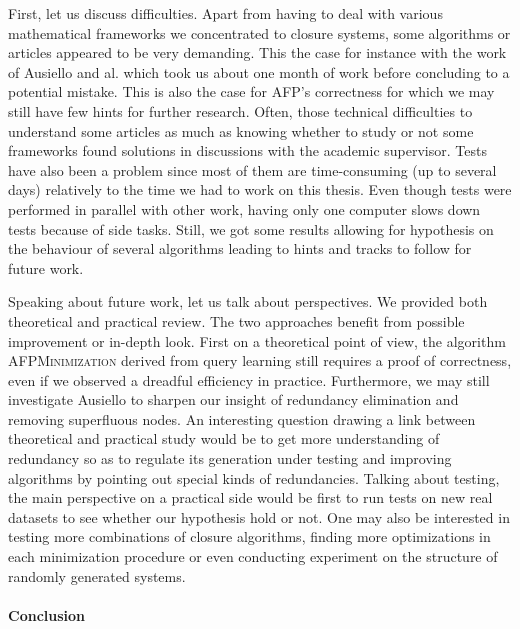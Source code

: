 First, let us discuss difficulties. Apart from having to deal with various mathematical frameworks we concentrated to closure systems, some algorithms
or articles appeared to be very demanding. This the case for instance with the work of Ausiello and al. which took us about one month of work before concluding to a potential mistake. This is also the case for \textsc{AFP}'s correctness for which we may still have few hints for further research. Often, those technical difficulties to understand some articles as much as knowing whether to study or not some frameworks found solutions in discussions with the academic supervisor. Tests have also been a problem since most of them are time-consuming (up to several days) relatively to the time we had to work on this thesis. Even though tests were performed in parallel with other work, having only one computer slows down tests because of side tasks. Still, we got some results allowing for hypothesis
on the behaviour of several algorithms leading to hints and tracks to follow for future work.

\vspace{1.2em}

Speaking about future work, let us talk about perspectives. We provided both theoretical and practical review. The two approaches benefit from possible improvement or in-depth look. First on a theoretical point of view, the algorithm \textsc{AFPMinimization} derived from query learning still requires
a proof of correctness, even if we observed a dreadful efficiency in practice. Furthermore, we may still investigate Ausiello to sharpen our insight of redundancy elimination and removing superfluous nodes. An interesting question
drawing a link between theoretical and practical study would be to get more
understanding of redundancy so as to regulate its generation under testing and
improving algorithms by pointing out special kinds of redundancies. Talking about testing, the main perspective on a practical side would be first to run tests on new real datasets to see whether our hypothesis hold or not. One may also be interested in testing more combinations of closure algorithms, finding
more optimizations in each minimization procedure or even conducting experiment on the structure of randomly generated systems.


\paragraph{Conclusion}

